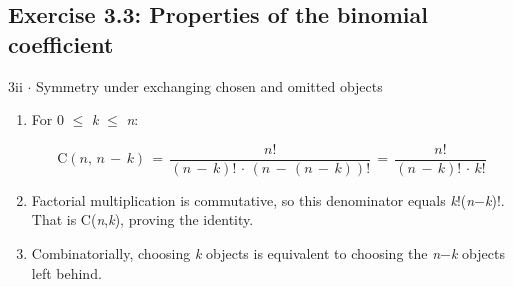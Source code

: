 \documentclass[11pt]{article}
\begin{document}
\begin{keepsection}\subsection{Exercise 3.3: Properties of the binomial coefficient}

\begin{workedbox}{3ii \ensuremath{\cdot} Symmetry under exchanging chosen and omitted objects}
\begin{enumerate}
\item {}
For 0 \ensuremath{\leq} \textit{k} \ensuremath{\leq} \textit{n}:

\begin{equation*}\mathrm{C}({n},\, {n}\, -\, {k})\, =\, \dfrac{{n}!}{({n}\, -\, {k})!\, \cdot \, ({n}\, -\, ({n}\, -\, {k}))!}\, =\, \dfrac{{n}!}{({n}\, -\, {k})!\, \cdot \, {k}!}\end{equation*}
\item Factorial multiplication is commutative, so this denominator equals \textit{k}!(\textit{n}\ensuremath{-}\textit{k})!. That is C(\textit{n},\textit{k}), proving the identity.
\item Combinatorially, choosing \textit{k} objects is equivalent to choosing the \textit{n}\ensuremath{-}\textit{k} objects left behind.
\end{enumerate}
\end{workedbox}

\end{keepsection}
\end{document}
